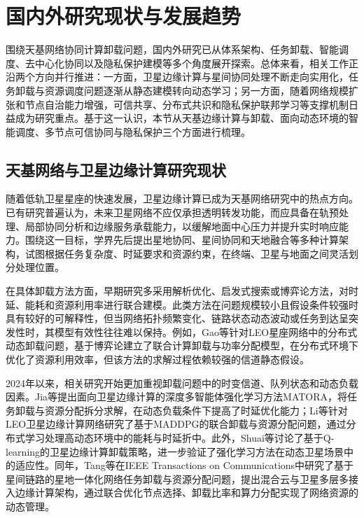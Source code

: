 \section{国内外研究现状与发展趋势}

围绕天基网络协同计算卸载问题，国内外研究已从体系架构、任务卸载、智能调度、去中心化协同以及隐私保护建模等多个角度展开探索。总体来看，相关工作正沿两个方向并行推进：一方面，卫星边缘计算与星间协同处理不断走向实用化，任务卸载与资源调度问题逐渐从静态建模转向动态学习；另一方面，随着网络规模扩张和节点自治能力增强，可信共享、分布式共识和隐私保护联邦学习等支撑机制日益成为研究重点。基于这一认识，本节从天基边缘计算与卸载、面向动态环境的智能调度、多节点可信协同与隐私保护三个方面进行梳理。

\subsection{天基网络与卫星边缘计算研究现状}

随着低轨卫星星座的快速发展，卫星边缘计算已成为天基网络研究中的热点方向。已有研究普遍认为，未来卫星网络不应仅承担透明转发功能，而应具备在轨预处理、局部协同分析和边缘服务承载能力，以缓解地面中心压力并提升实时响应能力\cite{ref1,ref4}。围绕这一目标，学界先后提出星地协同、星间协同和天地融合等多种计算架构，试图根据任务复杂度、时延要求和资源约束，在终端、卫星与地面之间灵活划分处理位置。

在具体卸载方法方面，早期研究多采用解析优化、启发式搜索或博弈论方法，对时延、能耗和资源利用率进行联合建模。此类方法在问题规模较小且假设条件较强时具有较好的可解释性，但当网络拓扑频繁变化、链路状态动态波动或任务到达呈突发性时，其模型有效性往往难以保持。例如，Gao等针对LEO星座网络中的分布式动态卸载问题，基于博弈论建立了联合计算卸载与功率分配模型，在分布式环境下优化了资源利用效率，但该方法的求解过程依赖较强的信道静态假设\cite{ref19}。

2024年以来，相关研究开始更加重视卸载问题中的时变信道、队列状态和动态负载因素。Jia等提出面向卫星边缘计算的深度多智能体强化学习方法MATORA，将任务卸载与资源分配拆分求解，在动态负载条件下提高了时延优化能力\cite{ref3}；Li等针对LEO卫星边缘计算网络研究了基于MADDPG的联合卸载与资源分配问题，通过分布式学习处理高动态环境中的能耗与时延折中\cite{ref2}。此外，Shuai等讨论了基于Q-learning的卫星边缘计算卸载策略，进一步验证了强化学习方法在动态卫星场景中的适应性\cite{ref5}。同年，Tang等在IEEE Transactions on Communications中研究了基于星间链路的星地一体化网络任务卸载与资源分配问题，提出混合云与卫星多层多接入边缘计算架构，通过联合优化节点选择、卸载比率和算力分配实现了网络资源的动态管理\cite{ref20}。

